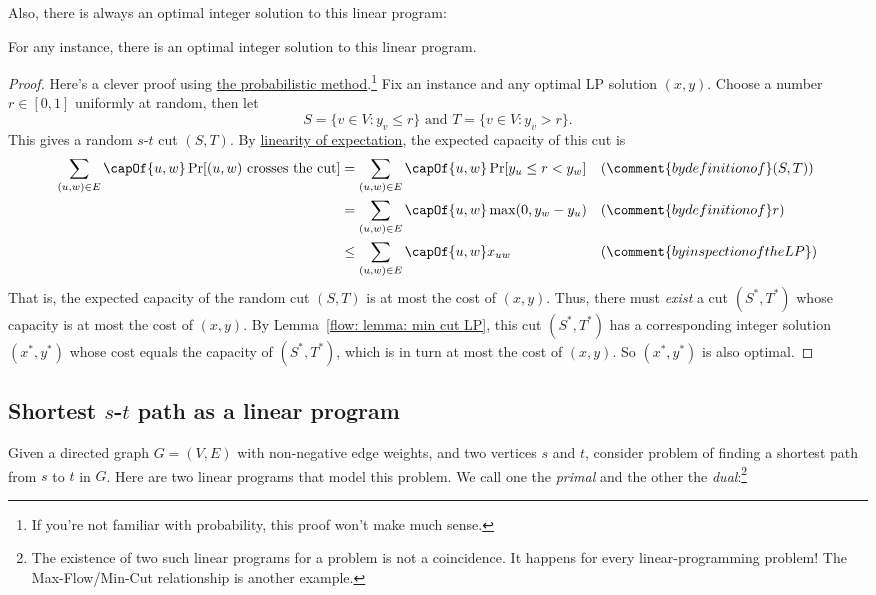 \providecommand{\wikipedia}[2]{\href{https://en.wikipedia.org/wiki/#2}{#1}}

Also, there is always an optimal integer solution to this linear program:
\begin{lemma}
  For any  instance,
  there is an optimal integer solution to this linear program.
\end{lemma}
\begin{proof}
  Here's a clever proof using \wikipedia{the probabilistic method}{probabilistic method}.\footnote
  {If you're not familiar with probability, this proof won't make much sense.}
  Fix an instance and any optimal LP solution $(x, y)$.
  Choose a number $r\in [0,1]$ uniformly at random,
  then let
  \[S=\{v\in V : y_v \le r\} \text{ and } T=\{v \in V: y_v > r\}.\]
  This gives a random $s$-$t$ cut $(S, T)$.
  By \wikipedia{linearity of expectation}{Expected_value\#Basic_properties}, the expected capacity of this cut is
  \begin{align*}
    \sum_{(u, w)\in E} \capOf{u,w} \Pr[(u,w) \text{ crosses the cut}]
    & {} =
      \sum_{(u, w)\in E} \capOf{u,w} \Pr[ y_u \le r < y_w] &&(\comment{by definition of } (S, T)) \\
    & {} =
      \sum_{(u, w)\in E} \capOf{u,w} \max(0, y_w - y_u) && (\comment{by definition of } r)\\
    & {} \le
      \sum_{(u, w)\in E} \capOf{u,w} x_{uw} && (\comment{by inspection of the LP})
  \end{align*}
  That is, the expected capacity of the random cut $(S, T)$ is at most the cost of $(x, y)$.
  Thus, there must \emph{exist} a cut $(S^*, T^*)$ whose capacity is at most the cost of $(x, y)$.
  By Lemma~\ref{flow: lemma: min cut LP}, this cut $(S^*, T^*)$ has a corresponding integer solution $(x^*, y^*)$
  whose cost equals the capacity of $(S^*, T^*)$, which is in turn at most the cost of $(x, y)$.
  So $(x^*, y^*)$ is also optimal.
\end{proof}
\providecommand{\inbrs}{\text{\sf in}} 
\providecommand{\onbrs}{\text{\sf out}} 

\subsection{Shortest $s$-$t$ path as a linear program}\label{flow: sec: shortest path as LP}
Given a directed graph $G=(V, E)$ with non-negative edge weights,
and two vertices $s$ and $t$,
consider problem of finding a shortest path from $s$ to $t$ in $G$.
Here are two linear programs that model this problem.
We call one the \emph{primal} and the other the \emph{dual}:\footnote
{The existence of two such linear programs for a problem is not a coincidence.
  It happens for every linear-programming problem!
  The Max-Flow/Min-Cut relationship is another example.}

